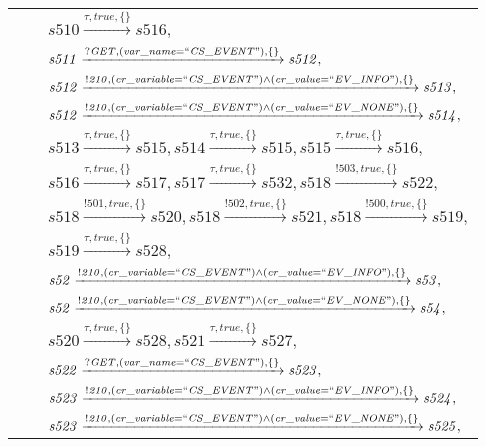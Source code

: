 \begin{tabular}{lcp{350px}}
& & $\mathit{s510}\xrightarrow{\mathit{\tau}, \mathit{true}, \{\}}\mathit{s516},$ \\
& & $\mathit{s511}\xrightarrow{\mathit{?GET}, \mathit{(var\_name = ``CS\_EVENT")}, \{\}}\mathit{s512},$ \\
& & $\mathit{s512}\xrightarrow{\mathit{!210}, \mathit{(cr\_variable = ``CS\_EVENT") \land (cr\_value = ``EV\_INFO")}, \{\}}\mathit{s513},$ \\
& & $\mathit{s512}\xrightarrow{\mathit{!210}, \mathit{(cr\_variable = ``CS\_EVENT") \land (cr\_value = ``EV\_NONE")}, \{\}}\mathit{s514},$ \\
& & $\mathit{s513}\xrightarrow{\mathit{\tau}, \mathit{true}, \{\}}\mathit{s515},\mathit{s514}\xrightarrow{\mathit{\tau}, \mathit{true}, \{\}}\mathit{s515},\mathit{s515}\xrightarrow{\mathit{\tau}, \mathit{true}, \{\}}\mathit{s516},$ \\
& & $\mathit{s516}\xrightarrow{\mathit{\tau}, \mathit{true}, \{\}}\mathit{s517},\mathit{s517}\xrightarrow{\mathit{\tau}, \mathit{true}, \{\}}\mathit{s532},\mathit{s518}\xrightarrow{\mathit{!503}, \mathit{true}, \{\}}\mathit{s522},$ \\
& & $\mathit{s518}\xrightarrow{\mathit{!501}, \mathit{true}, \{\}}\mathit{s520},\mathit{s518}\xrightarrow{\mathit{!502}, \mathit{true}, \{\}}\mathit{s521},\mathit{s518}\xrightarrow{\mathit{!500}, \mathit{true}, \{\}}\mathit{s519},$ \\
& & $\mathit{s519}\xrightarrow{\mathit{\tau}, \mathit{true}, \{\}}\mathit{s528},$ \\
& & $\mathit{s52}\xrightarrow{\mathit{!210}, \mathit{(cr\_variable = ``CS\_EVENT") \land (cr\_value = ``EV\_INFO")}, \{\}}\mathit{s53},$ \\
& & $\mathit{s52}\xrightarrow{\mathit{!210}, \mathit{(cr\_variable = ``CS\_EVENT") \land (cr\_value = ``EV\_NONE")}, \{\}}\mathit{s54},$ \\
& & $\mathit{s520}\xrightarrow{\mathit{\tau}, \mathit{true}, \{\}}\mathit{s528},\mathit{s521}\xrightarrow{\mathit{\tau}, \mathit{true}, \{\}}\mathit{s527},$ \\
& & $\mathit{s522}\xrightarrow{\mathit{?GET}, \mathit{(var\_name = ``CS\_EVENT")}, \{\}}\mathit{s523},$ \\
& & $\mathit{s523}\xrightarrow{\mathit{!210}, \mathit{(cr\_variable = ``CS\_EVENT") \land (cr\_value = ``EV\_INFO")}, \{\}}\mathit{s524},$ \\
& & $\mathit{s523}\xrightarrow{\mathit{!210}, \mathit{(cr\_variable = ``CS\_EVENT") \land (cr\_value = ``EV\_NONE")}, \{\}}\mathit{s525},$ \\

\end{tabular}
